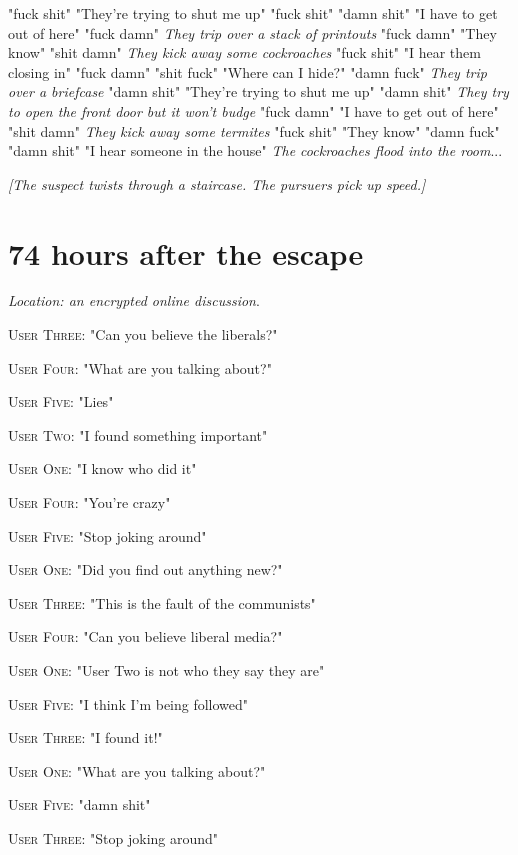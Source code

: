 \documentclass{report}
\begin{document}
"fuck shit" "They're trying to shut me up" "fuck shit" \textit{} "damn shit" "I have to get out of here" "fuck damn" \textit{They trip over a stack of printouts} "fuck damn" "They know" "shit damn" \textit{They kick away some cockroaches} "fuck shit" "I hear them closing in" "fuck damn" \textit{} "shit fuck" "Where can I hide?" "damn fuck" \textit{They trip over a briefcase} "damn shit" "They're trying to shut me up" "damn shit" \textit{They try to open the front door but it won't budge} "fuck damn" "I have to get out of here" "shit damn" \textit{They kick away some termites} "fuck shit" "They know" "damn fuck" \textit{} "damn shit" "I hear someone in the house" \textit{The cockroaches flood into the room}...

\textit{[The suspect twists through a staircase. The pursuers pick up speed.]}


\section*{74 \small{hours after the escape}}

\textit{Location: an encrypted online discussion}. 

\textsc{User Three}: "Can you believe the liberals?" 

\textsc{User Four}: "What are you talking about?" 

\textsc{User Five}: "Lies" 

\textsc{User Two}: "I found something important" 

\textsc{User One}: "I know who did it" 

\textsc{User Four}: "You're crazy" 

\textsc{User Five}: "Stop joking around" 

\textsc{User One}: "Did you find out anything new?" 

\textsc{User Three}: "This is the fault of the communists" 

\textsc{User Four}: "Can you believe liberal media?" 

\textsc{User One}: "User Two is not who they say they are" 

\textsc{User Five}: "I think I'm being followed" 

\textsc{User Three}: "I found it!" 

\textsc{User One}: "What are you talking about?" 

\textsc{User Five}: "damn shit" 

\textsc{User Three}: "Stop joking around" 
\end{document}
